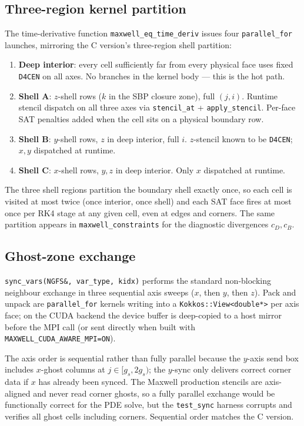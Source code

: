 \documentclass[11pt]{article}
\begin{document}
\subsection{Three-region kernel partition}

The time-derivative function \texttt{maxwell\_eq\_time\_deriv}
issues four \texttt{parallel\_for} launches, mirroring the C
version's three-region shell partition:

\begin{enumerate}[itemsep=1pt,topsep=2pt]
  \item \textbf{Deep interior}: every cell sufficiently far from
        every physical face uses fixed \texttt{D4CEN} on all axes.
        No branches in the kernel body --- this is the hot path.
  \item \textbf{Shell A}: $z$-shell rows ($k$ in the SBP closure
        zone), full $(j, i)$.  Runtime stencil dispatch on all
        three axes via \texttt{stencil\_at} +
        \texttt{apply\_stencil}.  Per-face SAT penalties added
        when the cell sits on a physical boundary row.
  \item \textbf{Shell B}: $y$-shell rows, $z$ in deep interior,
        full $i$.  $z$-stencil known to be \texttt{D4CEN}; $x, y$
        dispatched at runtime.
  \item \textbf{Shell C}: $x$-shell rows, $y, z$ in deep interior.
        Only $x$ dispatched at runtime.
\end{enumerate}
The three shell regions partition the boundary shell exactly
once, so each cell is visited at most twice (once interior, once
shell) and each SAT face fires at most once per RK4 stage at any
given cell, even at edges and corners.  The same partition appears
in \texttt{maxwell\_constraints} for the diagnostic divergences
$c_D, c_B$.

\subsection{Ghost-zone exchange}

\texttt{sync\_vars(NGFS\&, var\_type, kidx)} performs the standard
non-blocking neighbour exchange in three sequential axis sweeps
($x$, then $y$, then $z$).  Pack and unpack are
\texttt{parallel\_for} kernels writing into a
\texttt{Kokkos::View<double*>} per axis face; on the CUDA backend
the device buffer is deep-copied to a host mirror before the MPI
call (or sent directly when built with
\texttt{MAXWELL\_CUDA\_AWARE\_MPI=ON}).

The axis order is sequential rather than fully parallel because
the $y$-axis send box includes $x$-ghost columns at $j \in [g_s,
2g_s)$; the $y$-sync only delivers correct corner data if $x$ has
already been synced.  The Maxwell production stencils are
axis-aligned and never read corner ghosts, so a fully parallel
exchange would be functionally correct for the PDE solve, but the
\texttt{test\_sync} harness corrupts and verifies all ghost cells
including corners.  Sequential order matches the C version.
\end{document}
